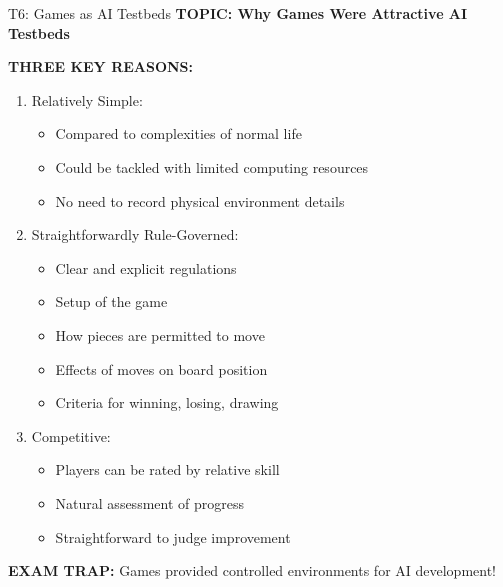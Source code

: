 \documentclass[8pt]{beamer}
\begin{document}
	\begin{frame}{T6: Games as AI Testbeds}
		\fontsize{6.5}{7.5}\selectfont
		\textbf{TOPIC: Why Games Were Attractive AI Testbeds}
		
		\vspace{0.1cm}
		\textbf{THREE KEY REASONS:}
		\begin{enumerate}
			\item \textcolor{myblue}{Relatively Simple:}
			\begin{itemize}
				\item Compared to complexities of normal life
				\item Could be tackled with limited computing resources
				\item No need to record physical environment details
			\end{itemize}
			\item \textcolor{myblue}{Straightforwardly Rule-Governed:}
			\begin{itemize}
				\item Clear and explicit regulations
				\item Setup of the game
				\item How pieces are permitted to move
				\item Effects of moves on board position
				\item Criteria for winning, losing, drawing
			\end{itemize}
			\item \textcolor{myblue}{Competitive:}
			\begin{itemize}
				\item Players can be rated by relative skill
				\item Natural assessment of progress
				\item Straightforward to judge improvement
			\end{itemize}
		\end{enumerate}
		
		\textcolor{myred}{\textbf{EXAM TRAP:}} Games provided \textcolor{myblue}{controlled environments} for AI development!
	\end{frame}
	
\end{document}

